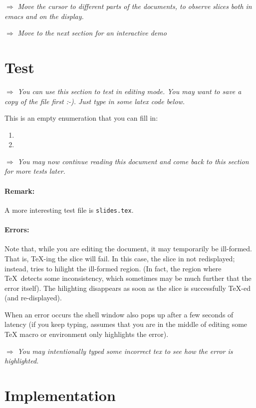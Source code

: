 \documentclass{article}
\let \lst \verb
\let \whizzy \WhizzyTeX
\def \instruction #1{\par\medskip \noindent$\Rightarrow$ {\em #1}}
\begin{document}
\instruction 
{Move the cursor to different parts of the documents, to observe 
slices both in emacs and on the display. }

\instruction {Move to the next section for an interactive demo}


\section {Test}

\instruction
{You can use this section to test in editing mode.
You may want to save a copy of the file first :-). 
Just type in some latex code below.}

This is an empty enumeration that you can fill in: 
\begin {enumerate}
\item
\item
\end {enumerate}

\instruction
{You may now continue reading this document and come back to this
section for more tests later.}

\paragraph{Remark:}
A more interesting test file is \lst"slides.tex".

\paragraph{Errors:}
Note that, while you are editing the document, it may temporarily be
ill-formed. That is, \TeX-ing the slice will fail. In this case, the slice in
not redisplayed; instead, {\whizzy} tries to hilight the ill-formed region.
(In fact, the region where \TeX\ detects some inconsistency, which sometimes
may be much further that the error itself). The hilighting disappears as
soon as the slice is successfully \TeX-ed (and re-displayed). 

When an error occurs the {\whizzy} shell window also pops up after a few
seconds of latency (if you keep typing, {\whizzy} assumes that you are in the
middle of editing some {\TeX} macro or environment only highlights the
error). 

\instruction
{You may intentionally typed some incorrect tex to see how the error is
highlighted.}


\section {Implementation}
\end{document}
